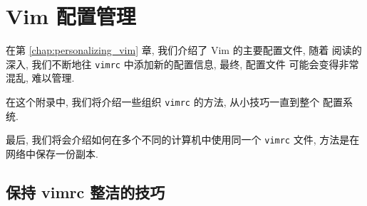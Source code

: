 \chapter{Vim 配置管理}
\label{chap:vim_configuration_alternatives}

在第 \ref{chap:personalizing_vim} 章, 我们介绍了 Vim 的主要配置文件, 随着
阅读的深入, 我们不断地往 \texttt{vimrc} 中添加新的配置信息, 最终, 配置文件
可能会变得非常混乱, 难以管理.

在这个附录中, 我们将介绍一些组织 \texttt{vimrc} 的方法, 从小技巧一直到整个
配置系统.

最后, 我们将会介绍如何在多个不同的计算机中使用同一个 \texttt{vimrc} 文件,
方法是在网络中保存一份副本.

\section{保持 vimrc 整洁的技巧}
\label{sec:tips_for_keeping_your_vimrc_file_clean}

